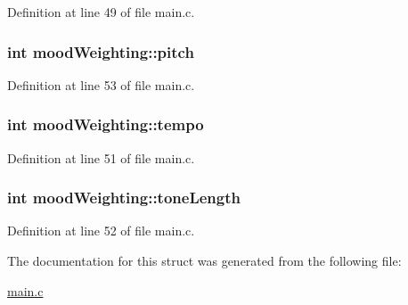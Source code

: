 Definition at line 49 of file main.\+c.

\hypertarget{structmood_weighting_a27410ec4f299961816407657a3e241e8}{
\subsubsection[{pitch}]{\setlength{\rightskip}{0pt plus 5cm}int mood\+Weighting\+::pitch}}\label{structmood_weighting_a27410ec4f299961816407657a3e241e8}


Definition at line 53 of file main.\+c.

\hypertarget{structmood_weighting_a9b2180e8a4aab163ae48d0a66269a840}{
\subsubsection[{tempo}]{\setlength{\rightskip}{0pt plus 5cm}int mood\+Weighting\+::tempo}}\label{structmood_weighting_a9b2180e8a4aab163ae48d0a66269a840}


Definition at line 51 of file main.\+c.

\hypertarget{structmood_weighting_ab9e917ae02761f06d11c59645a45536d}{
\subsubsection[{tone\+Length}]{\setlength{\rightskip}{0pt plus 5cm}int mood\+Weighting\+::tone\+Length}}\label{structmood_weighting_ab9e917ae02761f06d11c59645a45536d}


Definition at line 52 of file main.\+c.



The documentation for this struct was generated from the following file\+:\begin{DoxyCompactItemize}
\item 
\hyperlink{main_8c}{main.\+c}\end{DoxyCompactItemize}
